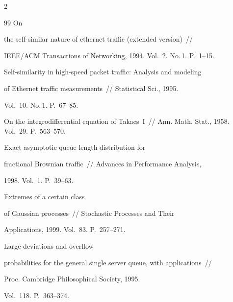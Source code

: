 \begin{multicols}{2}
{{\begin{thebibliography}{99}
 On


the self-similar nature of ethernet traffic (extended version)~//


IEEE/ACM Transactions of Networking, 1994. Vol.~2. No.\,1. P.~1--15.









Self-similarity in high-speed packet traffic: Analysis and modeling


of Ethernet traffic measurements~// Statistical Sci., 1995.


Vol.~10. No.\,1. P.~67--85.







 On the integrodifferential equation of Takacs~I~// Ann. Math. Stat., 1958. Vol.~29. P.~563--570.







 Exact asymptotic queue length distribution for


fractional Brownian traffic~// Advances in Performance Analysis,


1998. Vol.~1. P.~39--63.







 Extremes of a certain class


of Gaussian processes~// Stochastic Processes and Their


Applications, 1999. Vol.~83. P.~257--271.










 Large deviations and overflow


probabilities for the general single server queue, with applications~// 


Proc. Cambridge Philosophical Society, 1995.


Vol.~118. P.~363--374.






\end{thebibliography}}}
\end{multicols}
